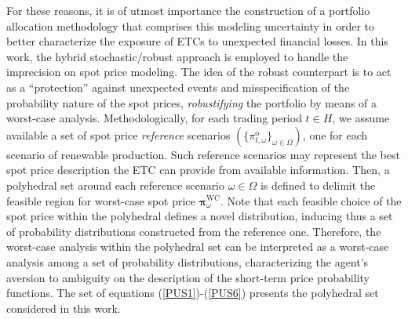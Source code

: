 	For these reasons, it is of utmost importance the construction of a portfolio allocation methodology that comprises this modeling uncertainty in order to better characterize the exposure of ETCs to unexpected financial losses. In this work, the hybrid stochastic/robust approach is employed to handle the imprecision on spot price modeling. The idea of the robust counterpart is to act as a ``protection'' against unexpected events and misspecification of the probability nature of the spot prices, \textit{robustifying} the portfolio by means of a worst-case analysis. Methodologically, for each trading period $t \in H$, we assume available a set of spot price \textit{reference} scenarios $(\{\pi^{\text{o}}_{t,\omega}\}_{\omega \in \Omega})$, one for each scenario of renewable production. Such reference scenarios may represent the best spot price description the ETC can provide from available information. Then, a polyhedral set around each reference scenario $\omega \in \Omega$ is defined to delimit the feasible region for worst-case spot price $\boldsymbol{\pi}^{\text{WC}}_{\omega}$. Note that each feasible choice of the spot price within the polyhedral defines a novel distribution, inducing thus a set of probability distributions constructed from the reference one. Therefore, the worst-case analysis within the polyhedral set can be interpreted as a worst-case analysis among a set of probability distributions, characterizing the agent's aversion to ambiguity on the description of the short-term price probability functions. The set of equations (\ref{PUS1})-(\ref{PUS6}) presents the polyhedral set considered in this work.
%
